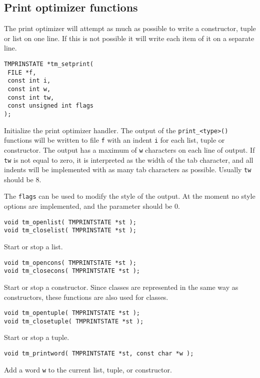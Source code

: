 \subsection{Print optimizer functions}
The print optimizer will attempt as much as possible to write a constructor,
tuple or list on one line.
If this is not possible it will write each item of it on a separate line.
\par
\begin{verbatim}
TMPRINSTATE *tm_setprint(
 FILE *f,
 const int i,
 const int w,
 const int tw,
 const unsigned int flags
);
\end{verbatim}
\begin{desc}
Initialize the print optimizer handler.
The output of the {\tt print\_<type>()} functions will be written to
file {\tt f} with an indent {\tt i} for each list, tuple or constructor.
The output has a maximum of {\tt w} characters on each line of output.
If {\tt tw} is not equal to zero, it is interpreted as the width of the
tab character, and all indents will be implemented with as many tab
characters as possible.
Usually \verb'tw' should be 8.
\par
The {\tt flags} can be used to modify the style of the output. At the
moment no style options are implemented, and the parameter should be 0.
\end{desc}
\begin{verbatim}
void tm_openlist( TMPRINTSTATE *st );
void tm_closelist( TMPRINSTATE *st );
\end{verbatim}
\begin{desc}
Start or stop a list.
\end{desc}
\begin{verbatim}
void tm_opencons( TMPRINTSTATE *st );
void tm_closecons( TMPRINTSTATE *st );
\end{verbatim}
\begin{desc}
Start or stop a constructor. Since classes are represented in the
same way as constructors, these functions are also used for classes.
\end{desc}
\begin{verbatim}
void tm_opentuple( TMPRINTSTATE *st );
void tm_closetuple( TMPRINTSTATE *st );
\end{verbatim}
\begin{desc}
Start or stop a tuple.
\end{desc}
\begin{verbatim}
void tm_printword( TMPRINTSTATE *st, const char *w );
\end{verbatim}
\begin{desc}
Add a word {\tt w} to the current list, tuple, or constructor.
\end{desc}
